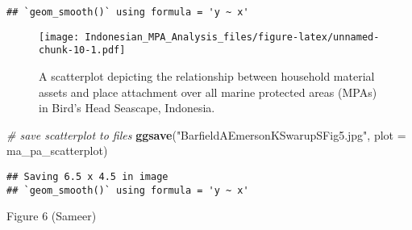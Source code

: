 \documentclass[
]{article}
\newenvironment{Shaded}{\begin{snugshade}}{\end{snugshade}}
\newcommand{\AttributeTok}[1]{\textcolor[rgb]{0.13,0.29,0.53}{#1}}
\newcommand{\CommentTok}[1]{\textcolor[rgb]{0.56,0.35,0.01}{\textit{#1}}}
\newcommand{\FunctionTok}[1]{\textcolor[rgb]{0.13,0.29,0.53}{\textbf{#1}}}
\newcommand{\NormalTok}[1]{#1}
\newcommand{\StringTok}[1]{\textcolor[rgb]{0.31,0.60,0.02}{#1}}
\begin{document}
\begin{verbatim}
## `geom_smooth()` using formula = 'y ~ x'
\end{verbatim}

\begin{figure}
\centering
\texttt{[image: Indonesian\_MPA\_Analysis\_files/figure-latex/unnamed-chunk-10-1.pdf]}
\caption{A scatterplot depicting the relationship between household
material assets and place attachment over all marine protected areas
(MPAs) in Bird's Head Seascape, Indonesia.}
\end{figure}

\begin{Shaded}
\begin{Highlighting}[]
\CommentTok{\# save scatterplot to files }
\FunctionTok{ggsave}\NormalTok{(}\StringTok{"BarfieldAEmersonKSwarupSFig5.jpg"}\NormalTok{, }\AttributeTok{plot =}\NormalTok{ ma\_pa\_scatterplot)}
\end{Highlighting}
\end{Shaded}

\begin{verbatim}
## Saving 6.5 x 4.5 in image
## `geom_smooth()` using formula = 'y ~ x'
\end{verbatim}

Figure 6 (Sameer)
\end{document}
